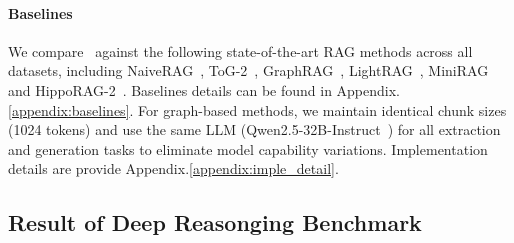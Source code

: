 

\paragraph{Baselines}
We compare \model\ against the following state-of-the-art RAG methods across all datasets, including NaiveRAG~\citep{gao2023rag_survey}, ToG-2~\citep{ma2024tog2}, GraphRAG~\citep{edge2024local}, LightRAG~\citep{guo2024lightrag}, MiniRAG~\citep{fan2025minirag} and HippoRAG-2~\citep{gutiérrez2025HippoRAG2}. Baselines details can be found in Appendix.\ref{appendix:baselines}.
For graph-based methods, we maintain identical chunk sizes (1024 tokens) and use the same LLM (Qwen2.5-32B-Instruct~\citep{qwen2.5}) for all extraction and generation tasks to eliminate model capability variations. Implementation details are provide Appendix.\ref{appendix:imple_detail}.



\subsection{Result of Deep Reasonging Benchmark}


